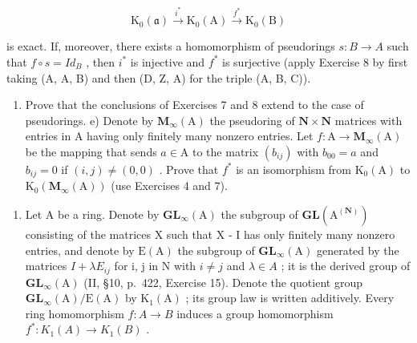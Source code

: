 \[
\mathrm{K} _ {0} (\mathfrak {a}) \xrightarrow {i ^ {*}} \mathrm{K} _ {0} (\mathrm{A}) \xrightarrow {f ^ {*}} \mathrm{K} _ {0} (\mathrm{B})
\]

is exact. If, moreover, there exists a homomorphism of pseudorings \(s: B \to A\) such that \(f \circ s = Id_{B}\) , then \(i^{*}\) is injective and \(f^{*}\) is surjective (apply Exercise 8 by first taking (A, A, B) and then (D, Z, A) for the triple (A, B, C)).

\begin{enumerate}
\def\labelenumi{\alph{enumi})}
\setcounter{enumi}{3}
\tightlist
\item
  Prove that the conclusions of Exercises 7 and 8 extend to the case of pseudorings. e) Denote by \(\mathbf{M}_{\infty}(\mathrm{A})\) the pseudoring of \(\mathbf{N} \times \mathbf{N}\) matrices with entries in A having only finitely many nonzero entries. Let \(f: \mathrm{A} \to \mathbf{M}_{\infty}(\mathrm{A})\) be the mapping that sends \(a \in \mathrm{A}\) to the matrix \((b_{ij})\) with \(b_{00} = a\) and \(b_{ij} = 0\) if \((i,j) \neq (0,0)\) . Prove that \(f^{*}\) is an isomorphism from \(\mathrm{K}_0(\mathrm{A})\) to \(\mathrm{K}_0(\mathbf{M}_{\infty}(\mathrm{A}))\) (use Exercises 4 and 7).
\end{enumerate}

\begin{enumerate}
\def\labelenumi{\arabic{enumi})}
\setcounter{enumi}{9}
\tightlist
\item
  Let A be a ring. Denote by \(\mathbf{GL}_{\infty}(\mathrm{A})\) the subgroup of \(\mathbf{GL}(\mathrm{A}^{(\mathbf{N})})\) consisting of the matrices X such that X - I has only finitely many nonzero entries, and denote by \(\mathrm{E}(\mathrm{A})\) the subgroup of \(\mathbf{GL}_{\infty}(\mathrm{A})\) generated by the matrices \(I + \lambda E_{ij}\) for i, j in N with \(i \neq j\) and \(\lambda \in A\) ; it is the derived group of \(\mathbf{GL}_{\infty}(\mathrm{A})\) (II, §10, p.~422, Exercise 15). Denote the quotient group \(\mathbf{GL}_{\infty}(\mathrm{A}) / \mathrm{E}(\mathrm{A})\) by \(\mathrm{K}_{1}(\mathrm{A})\) ; its group law is written additively. Every ring homomorphism \(f : A \to B\) induces a group homomorphism \(f^{*} : K_{1}(A) \to K_{1}(B)\) .
\end{enumerate}

